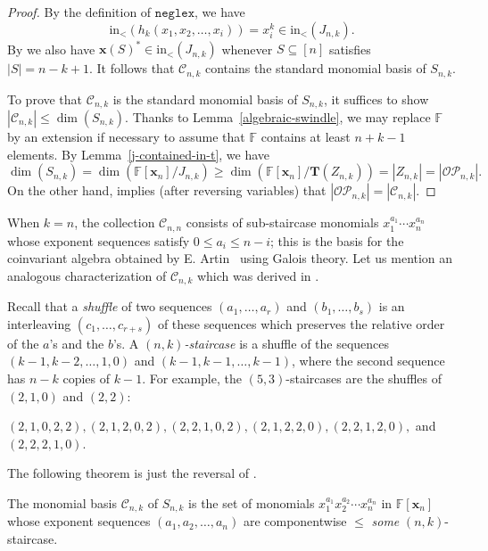 \documentclass[ALCO,ThmDefs,published]{cedram}
\newcommand{\xx}{{\mathbf {x}}}
\newcommand{\FF}{{\mathbb{F}}}
\theoremstyle{plain}
\newcommand{\init}{{\mathrm {in}}}
\newcommand{\neglex}{{\mathtt {neglex}}}
\newcommand{\OP}{{\mathcal{OP}}}
\newcommand{\FF}{{\mathbb{F}}}
\newcommand{\CCC}{{\mathcal{C}}}
\newcommand{\xx}{{\mathbf {x}}}
\newcommand{\TT}{{\mathbf {T}}}
\begin{document}
\begin{proof}
By the definition of $\neglex$, we have
\begin{equation}
\init_<(h_k(x_1, x_2, \dots, x_i)) = x_i^k \in \init_<(J_{n,k}).
\end{equation}
By \cite[Lem. 3.4, Lem. 3.5]{HRS} we also have $\xx(S)^* \in \init_<(J_{n,k})$ whenever $S \subseteq [n]$
satisfies $|S| = n-k+1$.  It follows that $\CCC_{n,k}$ contains the standard monomial basis of $S_{n,k}$.

To prove that $\CCC_{n,k}$ is the standard monomial basis of $S_{n,k}$, it suffices to show
$|\CCC_{n,k}| \leq \dim(S_{n,k})$.  Thanks to Lemma~\ref{algebraic-swindle}, we may replace $\FF$ by an extension
if necessary to assume that $\FF$ contains at least $n+k-1$ elements.
By Lemma~\ref{j-contained-in-t}, we have 
\begin{equation}
\dim(S_{n,k}) = \dim \left( {\FF[\xx_n]} / {J_{n,k}} \right) 
\geq \dim \left( {\FF[\xx_n]} / {\TT(Z_{n,k})} \right) = |Z_{n,k}| = |\OP_{n,k}|.
\end{equation}
On the other hand, \cite[Thm. 4.9]{HRS} implies (after reversing variables) that
$|\OP_{n,k}| = |\CCC_{n,k}|$.
\end{proof}


When $k = n$, the collection $\CCC_{n,n}$ consists of sub-staircase monomials 
$x_1^{a_1} \cdots x_n^{a_n}$ whose exponent sequences satisfy $0 \leq a_i \leq n-i$; 
this is the basis for the coinvariant algebra obtained by E. Artin~\cite{Artin} using Galois theory.
Let us mention an analogous characterization of $\CCC_{n,k}$ which was derived in \cite{HRS}.

Recall that a \emph{shuffle} of two sequences $(a_1, \dots, a_r)$ and $(b_1, \dots, b_s)$ 
is an interleaving $(c_1, \dots, c_{r+s})$ of these sequences which preserves the relative order
of the $a$'s and the $b$'s.  
A \emph{$(n,k)$-staircase} is a shuffle of the sequences
$(k-1, k-2, \dots, 1, 0)$ and $(k-1, k-1, \dots, k-1)$, where the second sequence has $n-k$ copies of $k-1$.
For example, the $(5,3)$-staircases are the shuffles of $(2,1,0)$ and $(2,2)$:
\begin{center}
$(2,1,0,2,2), (2,1,2,0,2), (2,2,1,0,2), (2,1,2,2,0), (2,2,1,2,0),$ and $(2,2,2,1,0)$.
\end{center}
The following theorem is just the reversal of \cite[Thm. 4.13]{HRS}.

\begin{corollary}
\label{staircase-standard} 
The monomial basis $\CCC_{n,k}$ of $S_{n,k}$ is the set of monomials $x_1^{a_1} x_2^{a_2} \cdots x_n^{a_n}$
in $\FF[\xx_n]$  whose exponent sequences $(a_1, a_2, \dots, a_n)$
are componentwise $\leq$ \emph{some} $(n,k)$-staircase.
\end{corollary}
\end{document}
